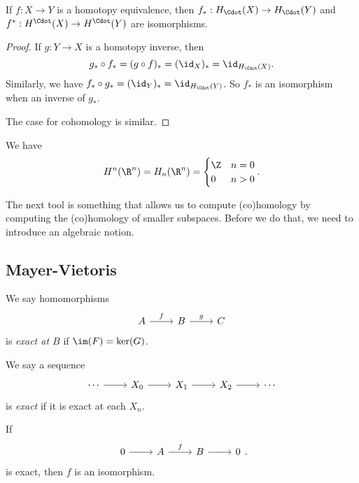 \documentclass[a4paper]{article}
\begin{document}
\begin{cor}
  If $f: X \to Y$ is a homotopy equivalence, then $f_*: H_{\Cdot}(X) \to H_{\Cdot}(Y)$ and $f^*: H^{\Cdot}(X) \to H^{\Cdot}(Y)$ are isomorphisms.
\end{cor}

\begin{proof}
  If $g: Y \to X$ is a homotopy inverse, then
  \[
    g_* \circ f_* = (g \circ f)_* = (\id_X)_* = \id_{H_{\Cdot}(X)}.
  \]
  Similarly, we have $f_* \circ g_* = (\id_Y)_* = \id_{H_{\Cdot}(Y)}$. So $f_*$ is an isomorphism when an inverse of $g_*$.

  The case for cohomology is similar.
\end{proof}

\begin{eg}
  We have
  \[
    H^n(\R^n) = H_n(\R^n) =
    \begin{cases}
      \Z & n = 0\\
      0 & n > 0
    \end{cases}.
  \]
\end{eg}

The next tool is something that allows us to compute (co)homology by computing the (co)homology of smaller subspaces. Before we do that, we need to introduce an algebraic notion.

\subsection{Mayer-Vietoris}
\begin{defi}
  We say homomorphisms
  \[
    \begin{tikzcd}
      A \ar[r, "f"] & B \ar[r, "g"] & C
    \end{tikzcd}
  \]
  is \emph{exact at $B$} if $\im(F) = \ker(G)$.

  We say a sequence
  \[
    \begin{tikzcd}
      \cdots \ar[r] & X_0 \ar[r] & X_1 \ar[r] & X_2 \ar[r] & \cdots
    \end{tikzcd}
  \]
  is \emph{exact} if it is exact at each $X_n$.
\end{defi}

\begin{eg}
  If
  \[
    \begin{tikzcd}
      0 \ar[r] & A \ar[r, "f"] & B \ar[r] & 0
    \end{tikzcd}.
  \]
  is exact, then $f$ is an isomorphism.
\end{eg}
\end{document}
